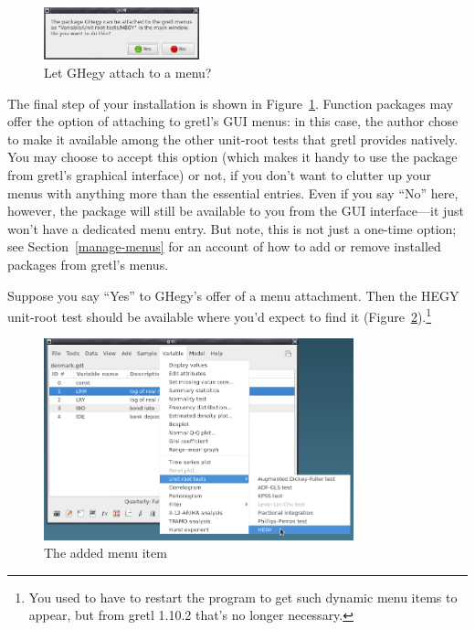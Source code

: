 \documentclass[oneside]{book}
\begin{document}
\begin{figure}[htbp]
\begin{center}
  \includegraphics[width=0.4\textwidth]{figures/ghegy-menu.png}
\end{center}
\caption{Let GHegy attach to a menu?}
\label{fig:ghegy-menu}
\end{figure}

The final step of your installation is shown in
Figure~\ref{fig:ghegy-menu}.  Function packages may offer the option
of attaching to gretl's GUI menus: in this case, the author chose to
make it available among the other unit-root tests that gretl provides
natively. You may choose to accept this option (which makes it handy
to use the package from gretl's graphical interface) or not, if you
don't want to clutter up your menus with anything more than the
essential entries. Even if you say ``No'' here, however, the package
will still be available to you from the GUI interface---it just won't
have a dedicated menu entry. But note, this is not just a one-time
option; see Section~\ref{manage-menus} for an account of how to add or
remove installed packages from gretl's menus.\label{pg:menu-hook}

Suppose you say ``Yes'' to \textsf{GHegy}'s offer of a menu
attachment. Then the HEGY unit-root test should be available where
you'd expect to find it (Figure~\ref{fig:ghegy-hook}).\footnote{You
  used to have to restart the program to get such dynamic menu items
  to appear, but from gretl 1.10.2 that's no longer necessary.}

\begin{figure}[htbp]
\begin{center}
  \includegraphics[width=0.8\textwidth]{figures/ghegy-hook.png}
\end{center}
\caption{The added menu item}
\label{fig:ghegy-hook}
\end{figure}
\end{document}
